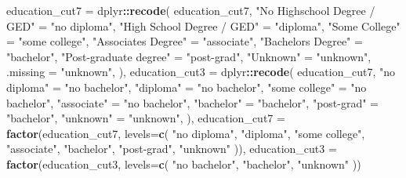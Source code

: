 \documentclass[
]{book}
\newenvironment{Shaded}{\begin{snugshade}}{\end{snugshade}}
\newcommand{\DataTypeTok}[1]{\textcolor[rgb]{0.13,0.29,0.53}{#1}}
\newcommand{\KeywordTok}[1]{\textcolor[rgb]{0.13,0.29,0.53}{\textbf{#1}}}
\newcommand{\NormalTok}[1]{#1}
\newcommand{\OperatorTok}[1]{\textcolor[rgb]{0.81,0.36,0.00}{\textbf{#1}}}
\newcommand{\StringTok}[1]{\textcolor[rgb]{0.31,0.60,0.02}{#1}}
\begin{document}
\begin{Shaded}
\begin{Highlighting}[]
\NormalTok{education\_cut7      =}\StringTok{ }\NormalTok{dplyr}\OperatorTok{::}\KeywordTok{recode}\NormalTok{(}
\NormalTok{  education\_cut7,}
  \StringTok{"No Highschool Degree / GED"}\NormalTok{  =}\StringTok{ "no diploma"}\NormalTok{,}
  \StringTok{"High School Degree / GED"}\NormalTok{    =}\StringTok{ "diploma"}\NormalTok{,}
  \StringTok{"Some College"}\NormalTok{                =}\StringTok{ "some college"}\NormalTok{,}
  \StringTok{"Associate\textquotesingle{}s Degree"}\NormalTok{          =}\StringTok{ "associate"}\NormalTok{,}
  \StringTok{"Bachelor\textquotesingle{}s Degree"}\NormalTok{           =}\StringTok{ "bachelor"}\NormalTok{,}
  \StringTok{"Post{-}graduate degree"}\NormalTok{        =}\StringTok{ "post{-}grad"}\NormalTok{,}
  \StringTok{"Unknown"}\NormalTok{                     =}\StringTok{ "unknown"}\NormalTok{,}
  \DataTypeTok{.missing                      =} \StringTok{"unknown"}\NormalTok{,}
\NormalTok{),}
\NormalTok{education\_cut3      =}\StringTok{ }\NormalTok{dplyr}\OperatorTok{::}\KeywordTok{recode}\NormalTok{(}
\NormalTok{  education\_cut7,}
  \StringTok{"no diploma"}\NormalTok{    =}\StringTok{ "no bachelor"}\NormalTok{,}
  \StringTok{"diploma"}\NormalTok{       =}\StringTok{ "no bachelor"}\NormalTok{,}
  \StringTok{"some college"}\NormalTok{  =}\StringTok{ "no bachelor"}\NormalTok{,}
  \StringTok{"associate"}\NormalTok{     =}\StringTok{ "no bachelor"}\NormalTok{,}
  \StringTok{"bachelor"}\NormalTok{      =}\StringTok{ "bachelor"}\NormalTok{,}
  \StringTok{"post{-}grad"}\NormalTok{     =}\StringTok{ "bachelor"}\NormalTok{,}
  \StringTok{"unknown"}\NormalTok{       =}\StringTok{ "unknown"}\NormalTok{,}
\NormalTok{),}
\NormalTok{education\_cut7 =}\StringTok{ }\KeywordTok{factor}\NormalTok{(education\_cut7, }\DataTypeTok{levels=}\KeywordTok{c}\NormalTok{(}
  \StringTok{"no diploma"}\NormalTok{,}
  \StringTok{"diploma"}\NormalTok{,}
  \StringTok{"some college"}\NormalTok{,}
  \StringTok{"associate"}\NormalTok{,}
  \StringTok{"bachelor"}\NormalTok{,}
  \StringTok{"post{-}grad"}\NormalTok{,}
  \StringTok{"unknown"}
\NormalTok{)),}
\NormalTok{education\_cut3 =}\StringTok{ }\KeywordTok{factor}\NormalTok{(education\_cut3, }\DataTypeTok{levels=}\KeywordTok{c}\NormalTok{(}
  \StringTok{"no bachelor"}\NormalTok{,}
  \StringTok{"bachelor"}\NormalTok{,}
  \StringTok{"unknown"}
\NormalTok{))}
\end{Highlighting}
\end{Shaded}
\end{document}
